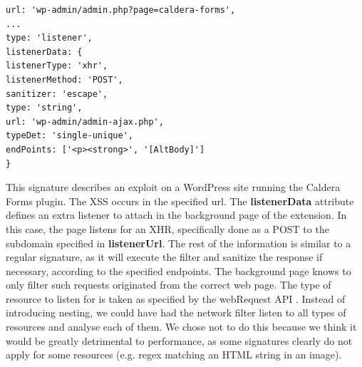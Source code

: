 \lstset{basicstyle=\small}
\begin{lstlisting}[breaklines=true,caption={A signature for a dynamic request},label={lst:dynamic_signature}]
url: 'wp-admin/admin.php?page=caldera-forms',
...
type: 'listener',
listenerData: {
listenerType: 'xhr',
listenerMethod: 'POST',
sanitizer: 'escape',
type: 'string',
url: 'wp-admin/admin-ajax.php',
typeDet: 'single-unique',
endPoints: ['<p><strong>', '[AltBody]']
}
\end{lstlisting}

This signature describes an exploit on a WordPress site running the Caldera Forms plugin. The XSS occurs in the specified url. The \textbf{listenerData} attribute defines an extra listener to attach in the background page of the extension. In this case, the page listens for an XHR, specifically done as a POST to the subdomain specified in \textbf{listenerUrl}. The rest of the information is similar to a regular signature, as it will execute the filter and sanitize the response if necessary, according to the specified endpoints. The background page knows to only filter such requests originated from the correct web page. The type of resource to listen for is taken as specified by the webRequest API \cite{webRequest}. Instead of introducing nesting, we could have had the network filter listen to all types of resources and analyse each of them. We chose not to do this because we think it would be greatly detrimental to performance, as some signatures clearly do not apply for some resources (e.g. regex matching an HTML string in an image).

